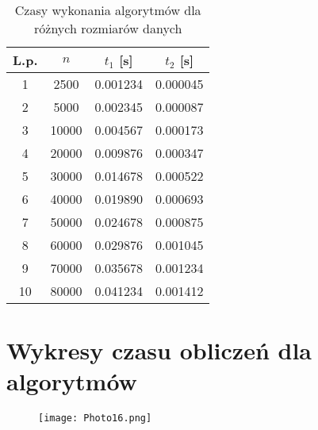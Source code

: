 \documentclass[a4paper,12pt]{article}
\begin{document}
\begin{table}[h!]
	\centering
	\begin{tabular}{|c|c|c|c|}
		\hline
		L.p. & $n$ & $t_1$ [s] & $t_2$ [s] \\
		\hline
		1 & 2500  & 0.001234 & 0.000045 \\
		2 & 5000  & 0.002345 & 0.000087 \\
		3 & 10000 & 0.004567 & 0.000173 \\
		4 & 20000 & 0.009876 & 0.000347 \\
		5 & 30000 & 0.014678 & 0.000522 \\
		6 & 40000 & 0.019890 & 0.000693 \\
		7 & 50000 & 0.024678 & 0.000875 \\
		8 & 60000 & 0.029876 & 0.001045 \\
		9 & 70000 & 0.035678 & 0.001234 \\
		10 & 80000 & 0.041234 & 0.001412 \\
		\hline
	\end{tabular}
	\caption{Czasy wykonania algorytmów dla różnych rozmiarów danych}
\end{table}
	\newpage
	\section{Wykresy czasu obliczeń dla algorytmów}
\begin{figure}[h!]
	\centering
	\texttt{[image: Photo16.png]}
\end{figure}
\end{document}
